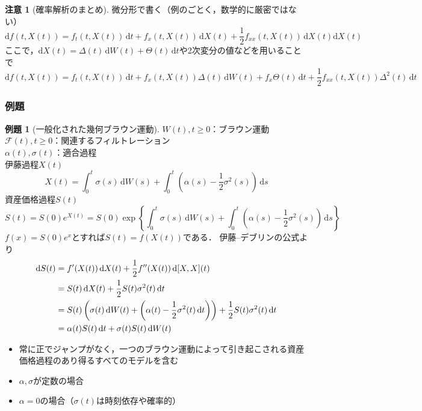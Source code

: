 \documentclass[a4paper, lualatex, ja=standard]{bxjsarticle}
\theoremstyle{definition}
\newtheorem{expl}[thm]{例題}
\newtheorem{note}[thm]{注意}
\newcommand{\F}{\mathcal{F}}
\newcommand{\diff}{\mathrm{d}}
\begin{document}
\begin{note}[確率解析のまとめ]
  微分形で書く（例のごとく，数学的に厳密ではない）
  \begin{equation}
    \diff f(t,X(t)) = f_t(t,X(t))\,\diff t + f_x(t,X(t))\,\diff X(t) + \frac{1}{2}f_{xx}(t,X(t))\,\diff X(t)\diff X(t)
  \end{equation}
  ここで，$\diff X(t)=\Delta(t)\,\diff W(t)+\Theta(t)\,\diff t$や2次変分の値などを用いることで
  \begin{equation}
    \diff f(t,X(t)) = f_t(t,X(t))\,\diff t + f_x(t,X(t))\Delta(t)\,\diff W(t) + f_x\Theta(t)\,\diff t + \frac{1}{2}f_{xx}(t,X(t))\Delta^2(t)\,\diff t
  \end{equation}
\end{note}

\subsubsection{例題}
\setcounter{equation}{24}
\begin{expl}[一般化された幾何ブラウン運動]
  $W(t),t\geq0$：ブラウン運動\\
  $\F(t),t\geq0$：関連するフィルトレーション\\
  $\alpha(t),\sigma(t)$：適合過程\\
  伊藤過程$X(t)$
  \begin{equation}
    X(t) = \int_0^t\sigma(s)\,\diff W(s) + \int_0^t\left(\alpha(s)-\frac{1}{2}\sigma^2(s)\right)\,\diff s
  \end{equation}
  資産価格過程$S(t)$
  \begin{equation}
    S(t)=S(0)e^{X(t)}=S(0)\exp\left\{\int_0^t\sigma(s)\,\diff W(s) + \int_0^t\left(\alpha(s)-\frac{1}{2}\sigma^2(s)\right)\,\diff s\right\}
    \label{eq:4.4.26}
  \end{equation}
  $f(x)=S(0)e^x$とすれば$S(t)=f(X(t))$である．
  伊藤--デブリンの公式より
  \begin{align}
    \diff S(t) &= f'(X(t))\,\diff X(t) + \frac{1}{2}f''(X(t))\,\diff [X,X](t)\notag\\
    &= S(t)\,\diff X(t) + \frac{1}{2}S(t)\sigma^2(t)\,\diff t\notag \\
    &= S(t)\left(\sigma(t)\,\diff W(t) + \left(\alpha(t)-\frac{1}{2}\sigma^2(t)\,\diff t\right)\right) + \frac{1}{2}S(t)\sigma^2(t)\,\diff t\notag\\
    &= \alpha(t)S(t)\,\diff t + \sigma(t)S(t)\,\diff W(t)
  \end{align}
  \begin{itemize}
    \item 常に正でジャンプがなく，一つのブラウン運動によって引き起こされる資産価格過程のあり得るすべてのモデルを含む
    \item $\alpha,\sigma$が定数の場合
    \item $\alpha=0$の場合（$\sigma(t)$は時刻依存や確率的）
  \end{itemize}
\end{expl}
\end{document}
